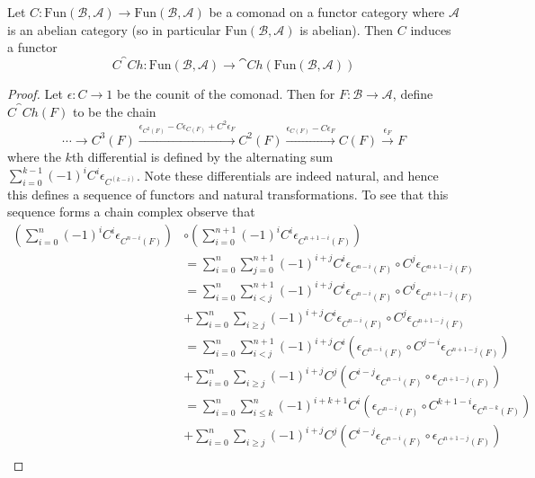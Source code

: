 \begin{lem}[label=lem:comonadChain]
    Let $C:\text{Fun}(\mathcal{B},\mathcal{A})\rightarrow \text{Fun}(\mathcal{B},\mathcal{A})$ be a comonad on a functor category where $\mathcal{A}$ is an abelian category (so in particular $\text{Fun}(\mathcal{B},\mathcal{A})$ is abelian). Then $C$ induces a functor $$C^\cat{Ch}:\text{Fun}(\mathcal{B},\mathcal{A})\rightarrow \cat{Ch}(\text{Fun}(\mathcal{B},\mathcal{A}))$$
\end{lem}
\begin{proof}
    Let $\epsilon:C\rightarrow 1$ be the counit of the comonad. Then for $F :\mathcal{B}\rightarrow \mathcal{A}$, define $C^\cat{Ch}(F)$ to be the chain
    \begin{equation*}
        \cdots \rightarrow C^3(F)\xrightarrow{\epsilon_{C^2(F)}-C\epsilon_{C(F)}+C^2\epsilon_F}C^2(F)\xrightarrow{\epsilon_{C(F)}-C\epsilon_F}C(F)\xrightarrow{\epsilon_F} F
    \end{equation*}
    where the $k$th differential is defined by the alternating sum $\sum_{i=0}^{k-1}(-1)^iC^i\epsilon_{C^{(k-i)}}$. Note these differentials are indeed natural, and hence this defines a sequence of functors and natural transformations. To see that this sequence forms a chain complex observe that
    \begin{align*}
        \left(\sum_{i=0}^{n}(-1)^iC^i\epsilon_{C^{n-i}(F)}\right)&\circ \left(\sum_{i=0}^{n+1}(-1)^iC^i\epsilon_{C^{n+1-i}(F)}\right) \\
        &= \sum_{i=0}^n\sum_{j=0}^{n+1}(-1)^{i+j}C^i\epsilon_{C^{n-i}(F)}\circ C^j\epsilon_{C^{n+1-j}(F)} \\
        &= \sum_{i=0}^n\sum_{i < j}^{n+1}(-1)^{i+j}C^i\epsilon_{C^{n-i}(F)}\circ C^j\epsilon_{C^{n+1-j}(F)} \\
        &+ \sum_{i=0}^n\sum_{i\geq j}(-1)^{i+j}C^i\epsilon_{C^{n-i}(F)}\circ C^j\epsilon_{C^{n+1-j}(F)} \\
        &= \sum_{i=0}^n\sum_{i < j}^{n+1}(-1)^{i+j}C^i\left(\epsilon_{C^{n-i}(F)}\circ C^{j-i}\epsilon_{C^{n+1-j}(F)} \right)\\
        &+ \sum_{i=0}^n\sum_{i\geq j}(-1)^{i+j}C^j\left(C^{i-j}\epsilon_{C^{n-i}(F)}\circ \epsilon_{C^{n+1-j}(F)} \right)\\ 
        &= \sum_{i=0}^n\sum_{i\leq k}^n(-1)^{i+k+1}C^{i}\left(\epsilon_{C^{n-i}(F)}\circ C^{k+1-i}\epsilon_{C^{n-k}(F)} \right) \tag{Substituting $k = j-1$}\\
        &+ \sum_{i=0}^n\sum_{i\geq j}(-1)^{i+j}C^j\left(C^{i-j}\epsilon_{C^{n-i}(F)}\circ \epsilon_{C^{n+1-j}(F)} \right)\\ 

\end{align*}
\end{proof}
